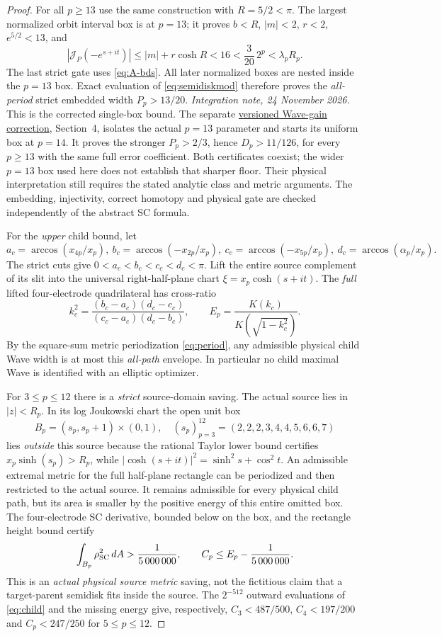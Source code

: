 \begin{proof}
For all $p\ge13$ use the
same construction with
$R=5/2<\pi$.
The largest normalized
orbit interval box is
at $p=13$; it proves
$b<R$, $|m|<2$, $r<2$,
$e^{5/2}<13$, and
\[
 |\mathcal{J}_P(-e^{s+it})|
 \le|m|+r\cosh R<16
 <\frac3{20}\,2^p
 <\lambda_pR_p.
\]
The last strict gate uses
\eqref{eq:A-bds}.
All later normalized boxes
are nested inside the $p=13$
box.  Exact evaluation of
\eqref{eq:semidiskmod}
therefore proves the
\emph{all-period} strict
embedded width $P_p>13/20$.
\emph{Integration note, 24 November 2026.}
This is the corrected single-box bound. The separate
\href{https://github.com/dovvnloading/loops-research-archive/blob/main/research/independent_audits/tip_family_wave_gain_correction_20261123/NOTE.md}{versioned Wave-gain correction},
Section~4, isolates the actual $p=13$ parameter and starts its uniform
box at $p=14$. It proves the stronger $P_p>2/3$, hence
$D_p>11/126$, for every $p\ge13$ with the same full error coefficient.
Both certificates coexist; the wider $p=13$ box used here does not
establish that sharper floor. Their physical interpretation still
requires the stated analytic class and metric arguments.
The embedding, injectivity,
correct homotopy and
physical gate are checked
independently of the
abstract SC formula.

For the \emph{upper} child
bound, let
\[
 a_c=\arccos(x_{4p}/x_p),\
 b_c=\arccos(-x_{2p}/x_p),\
 c_c=\arccos(-x_{5p}/x_p),\
 d_c=\arccos(\alpha_p/x_p).
\]
The strict cuts give
$0<a_c<b_c<c_c<d_c<\pi$.
Lift the entire source
complement of its slit
into the universal
right-half-plane chart
$\xi=x_p\cosh(s+it)$.
The \emph{full} lifted
four-electrode quadrilateral
has cross-ratio
\begin{equation}\label{eq:child}
 k_c^2=
 \frac{(b_c-a_c)(d_c-c_c)}
 {(c_c-a_c)(d_c-b_c)},\qquad
 E_p=\frac{K(k_c)}{K(\sqrt{1-k_c^2})}.
\end{equation}
By the square-sum metric
periodization \eqref{eq:period},
any admissible physical
child Wave width is at most
this \emph{all-path}
envelope.  In particular
no child maximal Wave is
identified with an
elliptic optimizer.

For $3\le p\le12$
there is a \emph{strict}
source-domain saving.
The actual source lies in
$|z|<R_p$.  In its log
Joukowski chart the open
unit box
\[
 B_p=(s_p,s_p+1)\times(0,1),\quad
 (s_p)_{p=3}^{12}=
 (2,2,2,3,4,4,5,6,6,7)
\]
lies \emph{outside} this
source because the
rational Taylor lower
bound certifies
$x_p\sinh(s_p)>R_p$,
while
$|\cosh(s+it)|^2=
 \sinh^2s+\cos^2t$.
An admissible extremal
metric for the full
half-plane rectangle
can be periodized and
then restricted to the
actual source.  It remains
admissible for every
physical child path,
but its area is smaller
by the positive energy
of this entire omitted
box.  The four-electrode
SC derivative, bounded
below on the box, and
the rectangle height
bound certify
\[
 \int_{B_p}\rho_{\rm SC}^2\,dA>
 \frac1{5\,000\,000},\qquad
 C_p\le E_p-\frac1{5\,000\,000}.
\]
This is an \emph{actual
physical source metric}
saving, not the fictitious
claim that a target-parent
semidisk fits inside
the source.  The
$2^{-512}$ outward
evaluations of
\eqref{eq:child} and
the missing energy give,
respectively,
$C_3<487/500$,
$C_4<197/200$ and
$C_p<247/250$ for
$5\le p\le12$.


\end{proof}
